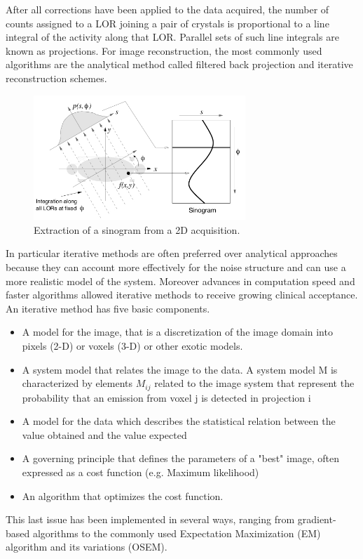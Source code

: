 After all corrections have been applied to the data acquired, the number of counts assigned to a LOR joining a pair of crystals is proportional to a line integral of the activity along that LOR. Parallel sets of such line integrals are known as projections.
For image reconstruction, the most commonly used algorithms are the analytical method called filtered back projection and iterative reconstruction schemes.
\begin{figure} 
\centering 
\includegraphics[width=8cm]{Pictures/Chapter_1/proj_sin.jpg}
\caption[Image reconstruction in PET]{Extraction of a sinogram from a 2D acquisition.}
\label{fig:reco}
\end{figure}
In particular iterative methods are often preferred over analytical approaches because they can account more effectively for the noise structure and can use a more realistic model of the system. Moreover advances in computation speed and faster algorithms allowed iterative methods to receive growing clinical acceptance.
An iterative method has five basic components.
\begin{itemize}
\item A model for the image, that is a discretization of the image domain into pixels (2-D) or voxels (3-D) or other exotic models.
\item A system model that relates the image to the data. A system model M is characterized by elements $M_{ij}$ related to the image system that represent the probability that an emission from voxel j is detected in projection i
\item A model for the data which describes the statistical relation between the value obtained and the value expected
\item A governing principle that defines the parameters of a "best" image, often expressed as a cost function (e.g. Maximum likelihood)
\item An algorithm that optimizes the cost function.
\end{itemize}

This last issue has been implemented in several ways, ranging from gradient-based algorithms to the commonly used Expectation Maximization (EM) algorithm and its variations (OSEM).

